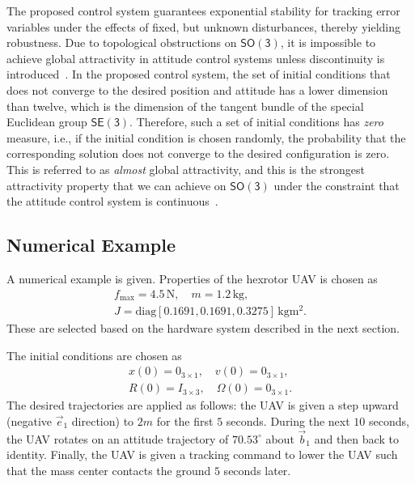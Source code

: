 \documentclass[twocolumn,letterpaper]{IEEEAerospaceCLS}  %
\newcommand{\refeqn}[1]{(\ref{eqn:#1})}
\newcommand{\SO}{\ensuremath{\mathsf{SO(3)}}}
\newcommand{\SE}{\ensuremath{\mathsf{SE(3)}}}
\newcommand{\Sph}{\ensuremath{\mathsf{S}}}
\begin{document}
The proposed control system guarantees exponential stability for tracking error variables under the effects of fixed, but unknown disturbances, thereby yielding robustness. Due to topological obstructions on $\SO$, it is impossible to achieve global attractivity in attitude control systems unless discontinuity is introduced~\cite{BhaBerSCL00}. In the proposed control system, the set of initial conditions that does not converge to the desired position and attitude has a lower dimension than twelve, which is the dimension of the tangent bundle of the special Euclidean group $\SE$. Therefore, such a set of initial conditions has \textit{zero} measure, i.e., if the initial condition is chosen randomly, the probability that the corresponding solution does not converge to the desired configuration is zero. This is referred to as \textit{almost} global attractivity, and this is the strongest attractivity property that we can achieve on $\SO$ under the constraint that the attitude control system is continuous~\cite{ChaMcCICSM11}. 


\subsection{Numerical Example}

A numerical example is given. Properties of the hexrotor UAV is chosen as
\begin{gather*}
f_{\max}=4.5\,{\mathrm{N}},\quad m=1.2\,{\mathrm{kg}},\\
J={\mathrm{diag}}[0.1691, 0.1691, 0.3275]\,{\mathrm{kgm^2}}.
\end{gather*}
These are selected based on the hardware system described in the next section. 

The initial conditions are chosen as 
\begin{gather*}
x(0)=0_{3\times 1},\quad v(0)=0_{3\times 1},\\
R(0)=I_{3\times 3},\quad \Omega(0)=0_{3\times 1}. 
\end{gather*}
The desired trajectories are applied as follows: the UAV is given a step upward (negative $\vec e_1$ direction) to $2m$ for the first $5$ seconds. During the next $10$ seconds, the UAV rotates on an attitude trajectory of $70.53^{\circ}$ about $\vec b_1$ and then back to identity. Finally, the UAV is given a tracking command to lower the UAV such that the mass center contacts the ground $5$ seconds later.
\end{document}
